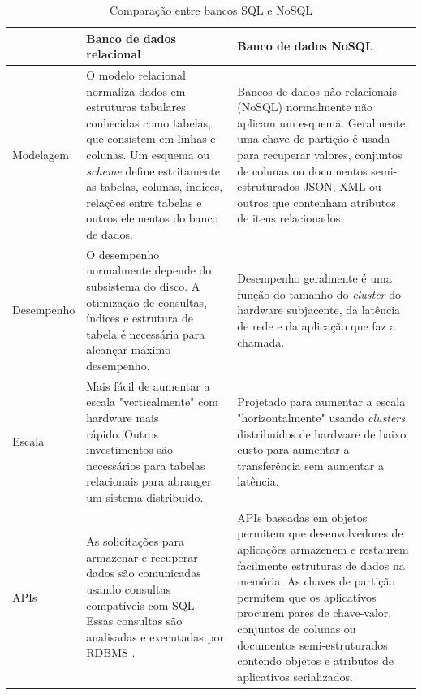 \begin{table}[H]
	\label{tabela-sql-nosql}
	\begin{tabular}{|m{2.5cm}|m{6cm}|m{6cm}|}
		 \hline	
		& Banco de dados relacional                                                                                                                                                                                                                            & Banco de dados NoSQL                                                                                                                                                                                                                                                                                                                \\ \hline 
		Modelagem   & O modelo relacional normaliza dados em estruturas tabulares conhecidas como tabelas, que consistem em linhas e colunas. Um esquema ou \textit{scheme} define estritamente as tabelas, colunas, índices, relações entre tabelas e outros elementos do banco de dados.     & Bancos de dados não relacionais (NoSQL) normalmente não aplicam um esquema. Geralmente, uma chave de partição é usada para recuperar valores, conjuntos de colunas ou documentos semi-estruturados JSON, XML ou outros que contenham atributos de itens relacionados.                                                                  \\ \hline 
		Desempenho  & O desempenho normalmente depende do subsistema do disco. A otimização de consultas, índices e estrutura de tabela é necessária para alcançar máximo desempenho.                                                                                      & Desempenho geralmente é uma função do tamanho do \textit{cluster} do hardware subjacente, da latência de rede e da aplicação que faz a chamada.  \\ \hline 
		Escala      & Mais fácil de aumentar a escala "verticalmente" com hardware mais rápido.,Outros investimentos são necessários para tabelas relacionais para abranger um sistema distribuído.                                                                        & Projetado para aumentar a escala "horizontalmente" usando \textit{clusters} distribuídos de hardware de baixo custo para aumentar a transferência sem aumentar a latência.                                \\ \hline 
		APIs & As solicitações para armazenar e recuperar dados são comunicadas usando consultas compatíveis com SQL. Essas consultas são analisadas e executadas por \ac{RDBMS} . & APIs baseadas em objetos permitem que desenvolvedores de aplicações armazenem e restaurem facilmente estruturas de dados na memória. As chaves de partição permitem que os aplicativos procurem pares de chave-valor, conjuntos de colunas ou documentos semi-estruturados contendo objetos e atributos de aplicativos serializados. \\ \hline 
	\end{tabular}
		\caption{Comparação entre bancos SQL e NoSQL}
\end{table}

